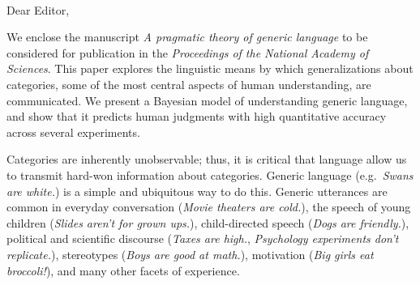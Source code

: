 \documentclass[11pt,letterpaper]{letter} %
\def\opening#1{\thispagestyle{empty}
{\centering\fromaddress \vspace{0.6in} \\ %
\hspace*{\longindentation}\hspace*{\fill}\par} %
\vspace{0.4in} %
\noindent #1 %
}
\begin{document}

\begin{letter}






\opening{Dear Editor,}


We enclose the manuscript \emph{A pragmatic theory of generic language} to be considered for publication in the \emph{Proceedings of the National Academy of Sciences}. 
This paper explores the linguistic means by which generalizations about categories, some of the most central aspects of human understanding, are communicated.  
We present a Bayesian model of understanding generic language, and show that it predicts human judgments with high quantitative accuracy across several experiments.


Categories are inherently unobservable; thus, it is critical that language allow us to transmit hard-won information about categories. Generic language (e.g.~\emph{Swans are white.}) is a simple and ubiquitous way to do this. 
Generic utterances are common in everyday conversation (\emph{Movie theaters are cold.}), the speech of young children (\emph{Slides aren't for grown ups.}), child-directed speech (\emph{Dogs are friendly.}), political and scientific discourse (\emph{Taxes are high.}, \emph{Psychology experiments don't replicate.}), stereotypes (\emph{Boys are good at math.}), motivation (\emph{Big girls eat broccoli!}), and many other facets of experience.


\end{letter}
\end{document}
